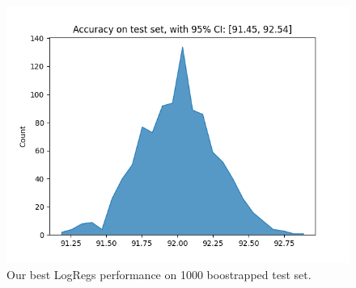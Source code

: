 
\begin{figure}[H]
    \centering
    \includegraphics[width=0.8\linewidth]{results/evaluation/logreg_confidence.png}
    \caption{Our best LogRegs performance on 1000 boostrapped test set.}
    \label{fig:appendix_ci}
\end{figure}